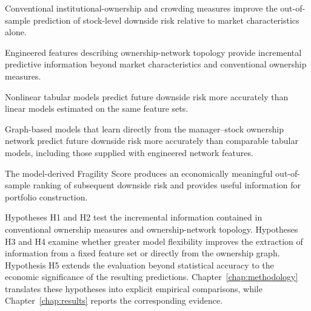 \begin{description}[leftmargin=2.2em, style=nextline]

      \item[H1 --- Conventional Ownership and Crowding.]
            Conventional institutional-ownership and crowding measures improve the out-of-sample prediction of stock-level downside risk relative to market characteristics alone.

      \item[H2 --- Ownership--Network Topology.]
            Engineered features describing ownership-network topology provide incremental predictive information beyond market characteristics and conventional ownership measures.

      \item[H3 --- Nonlinearity.]
            Nonlinear tabular models predict future downside risk more accurately than linear models estimated on the same feature sets.

      \item[H4 --- Graph Learning.]
            Graph-based models that learn directly from the manager--stock ownership network predict future downside risk more accurately than comparable tabular models, including those supplied with engineered network features.

      \item[H5 --- Economic Value.]
            The model-derived Fragility Score produces an economically meaningful out-of-sample ranking of subsequent downside risk and provides useful information for portfolio construction.

\end{description}

\noindent
Hypotheses H1 and H2 test the incremental information contained in conventional ownership measures and ownership-network topology. Hypotheses H3 and H4 examine whether greater model flexibility improves the extraction of information from a fixed feature set or directly from the ownership graph. Hypothesis H5 extends the evaluation beyond statistical accuracy to the economic significance of the resulting predictions. Chapter~\ref{chap:methodology} translates these hypotheses into explicit empirical comparisons, while Chapter~\ref{chap:results} reports the corresponding evidence.